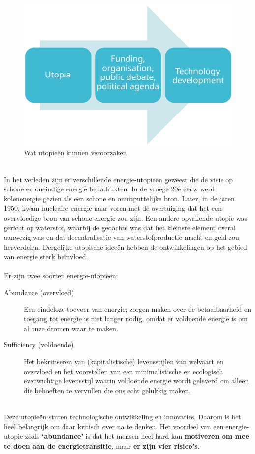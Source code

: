\documentclass[../summary.tex]{subfiles}
\begin{document}
	\begin{figure}[H]
		\centering
		\includegraphics[width=0.7\linewidth]{../images/wat-utopieen-doen}
		\caption{Wat utopieën kunnen veroorzaken}
		\label{fig:wat-utopieen-doen}
	\end{figure}
	\ \\
	In het verleden zijn er verschillende energie-utopieën geweest die de visie op schone en oneindige energie benadrukten. In de vroege 20e eeuw werd kolenenergie gezien als een schone en onuitputtelijke bron. Later, in de jaren 1950, kwam nucleaire energie naar voren met de overtuiging dat het een overvloedige bron van schone energie zou zijn. Een andere opvallende utopie was gericht op waterstof, waarbij de gedachte was dat het kleinste element overal aanwezig was en dat decentralisatie van waterstofproductie macht en geld zou herverdelen. Dergelijke utopische ideeën hebben de ontwikkelingen op het gebied van energie sterk beïnvloed.\\
	\\
	Er zijn twee soorten energie-utopieën:
	\begin{description}
		\item[Abundance (overvloed)] Een eindeloze toevoer van energie; zorgen maken over de betaalbaarheid en toegang tot energie is niet langer nodig, omdat er voldoende energie is om al onze dromen waar te maken.
		\item [Sufficiency (voldoende)] Het bekritiseren van (kapitalistische) levensstijlen van welvaart en overvloed en het voorstellen van een minimalistische en ecologisch evenwichtige levensstijl waarin voldoende energie wordt geleverd om alleen die behoeften te vervullen die ons echt gelukkig maken.
	\end{description}
	\ \\
	Deze utopieën sturen technologische ontwikkeling en innovaties. Daarom is het heel belangrijk om daar kritisch over na te denken. Het voordeel van een energie-utopie zoals \textbf{`abundance'} is dat het mensen heel hard kan \textbf{motiveren om mee te doen aan de energietransitie}, maar \textbf{er zijn vier risico's}.
\end{document}
